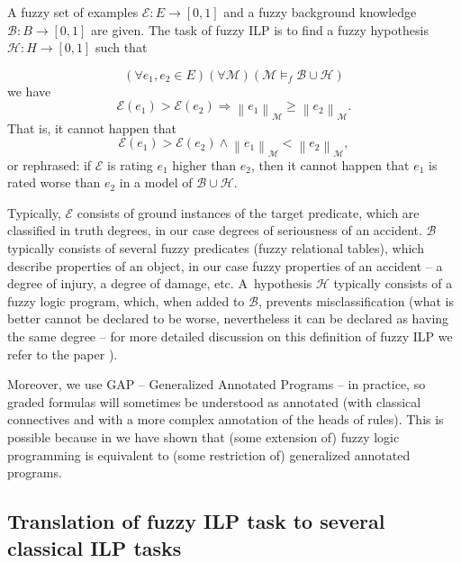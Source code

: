 \begin{definition}
A fuzzy set of examples ${\mathcal E}:E\longrightarrow [0,1]$ and a fuzzy background knowledge ${\mathcal B}:B\longrightarrow [0,1]$ are given. The task of fuzzy ILP is to find a fuzzy hypothesis ${\mathcal H}:H\longrightarrow [0,1]$ such that 

$$
(\forall e_1,e_2\in E)(\forall {\mathcal M})({\mathcal M}\models_f {\mathcal B}\cup {\mathcal H})
$$
we have
$$
{\mathcal E}(e_1)>{\mathcal E}(e_2)\Rightarrow \left\|e_1\right\|_{{\mathcal M}}\ge \left\|e_2\right\|_{{\mathcal M}}.
$$
That is, it cannot happen that
$$
{\mathcal E}(e_1)>{\mathcal E}(e_2) \wedge \left\|e_1\right\|_{{\mathcal M}}< \left\|e_2\right\|_{{\mathcal M}},
$$
or rephrased: if ${\mathcal E}$ is rating $e_1$ higher than $e_2$, then it cannot happen that $e_1$ is rated worse than $e_2$ in a model of ${\mathcal B}\cup {\mathcal H}$.
\end{definition}

Typically, ${\mathcal E}$ consists of ground instances of the target predicate, which are classified in truth degrees, in our case degrees of seriousness of an accident. ${\mathcal B}$ typically consists of several fuzzy predicates (fuzzy relational tables), which describe properties of an object, in our case fuzzy properties of an accident -- a degree of injury, a degree of damage, etc. 
A~hypothesis ${\mathcal H}$ typically consists of a fuzzy logic program, which, when added to ${\mathcal B}$, prevents misclassification (what is better cannot be declared to be worse, nevertheless it can be declared as having the same degree -- for more detailed discussion on this definition of fuzzy ILP we refer to the paper \citep{biblio:FILP}).

Moreover, we use GAP -- Generalized Annotated Programs -- in practice, so graded formulas will sometimes be understood as annotated (with classical connectives and with a more complex annotation of the heads of rules). This is possible because in \citep{biblio:KLV} we have shown that (some extension of) fuzzy logic programming is equivalent to (some restriction of) generalized annotated programs. 



\subsection{Translation of fuzzy ILP task to several classical ILP tasks}

